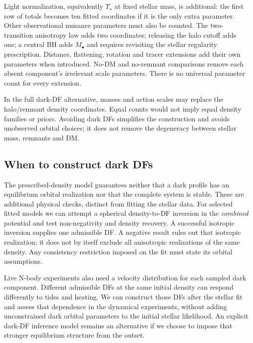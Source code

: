 \documentclass[11pt,a4paper]{article}
\begin{document}
Light normalization, equivalently $\Upsilon_\star$ at fixed stellar mass,
is additional: the first row of totals becomes ten fitted coordinates if it
is the only extra parameter. Other observational nuisance parameters must
also be counted. The two-transition anisotropy law adds two coordinates;
releasing the halo cutoff adds one; a central BH adds $M_\bullet$ and requires
revisiting the stellar regularity prescription. Distance, flattening,
rotation and tracer extensions add their own parameters when introduced.
No-DM and no-remnant comparisons remove each absent component's irrelevant
scale parameters. There is no universal parameter count for every extension.

In the full dark-DF alternative, masses and action scales may replace the
halo/remnant density coordinates. Equal counts would not imply equal density
families or priors. Avoiding dark DFs simplifies the construction and avoids
unobserved orbital choices; it does not remove the degeneracy between
stellar mass, remnants and DM.

\subsection{When to construct dark DFs}
\label{sec:dark-validation}

The prescribed-density model guarantees neither that a dark profile has an
equilibrium orbital realization nor that the complete system is stable.
These are additional physical checks, distinct from fitting the stellar
data. For selected fitted models we can attempt a spherical density-to-DF
inversion in the \emph{combined} potential and test non-negativity and density
recovery. A successful isotropic inversion supplies one admissible DF. A
negative result rules out that isotropic realization; it does not by itself
exclude all anisotropic realizations of the same density. Any consistency
restriction imposed on the fit must state its orbital assumptions.

Live N-body experiments also need a velocity distribution for each sampled
dark component. Different admissible DFs at the same initial density can
respond differently to tides and heating. We can construct those DFs after
the stellar fit and assess that dependence in the dynamical experiments,
without adding unconstrained dark orbital parameters to the initial stellar
likelihood. An explicit dark-DF inference model remains an alternative if
we choose to impose that stronger equilibrium structure from the outset.
\end{document}
